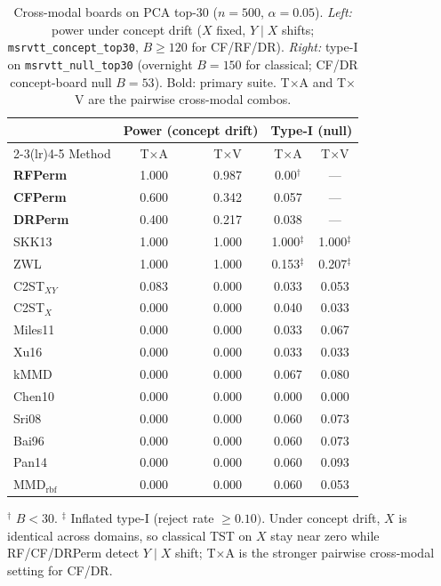 \begin{table}[t]
\centering
\small
\setlength{\tabcolsep}{5pt}
\caption{Cross-modal boards on PCA top-30 ($n=500$, $\alpha=0.05$).
  \emph{Left:} power under concept drift ($X$ fixed, $Y\mid X$ shifts;
  \texttt{msrvtt\_concept\_top30}, $B\ge 120$ for CF/RF/DR).
  \emph{Right:} type-I on \texttt{msrvtt\_null\_top30}
  (overnight $B=150$ for classical; CF/DR concept-board null $B=53$).
  Bold: primary suite. T$\times$A and T$\times$V are the pairwise cross-modal combos.}
\label{tab:cross-modal-TA-TV}
\begin{tabular}{l cc @{\hspace{1.2em}} cc}
\toprule
& \multicolumn{2}{c}{\textbf{Power} (concept drift)}
& \multicolumn{2}{c}{\textbf{Type-I} (null)} \\
\cmidrule(lr){2-3}\cmidrule(lr){4-5}
Method & T$\times$A & T$\times$V & T$\times$A & T$\times$V \\
\midrule
\textbf{RFPerm} & 1.000 & 0.987 & 0.00$^\dagger$ & --- \\
\textbf{CFPerm} & 0.600 & 0.342 & 0.057 & --- \\
\textbf{DRPerm} & 0.400 & 0.217 & 0.038 & --- \\
\midrule
SKK13 & 1.000 & 1.000 & 1.000$^\ddagger$ & 1.000$^\ddagger$ \\
ZWL & 1.000 & 1.000 & 0.153$^\ddagger$ & 0.207$^\ddagger$ \\
C2ST$_{XY}$ & 0.083 & 0.000 & 0.033 & 0.053 \\
C2ST$_X$ & 0.000 & 0.000 & 0.040 & 0.033 \\
Miles11 & 0.000 & 0.000 & 0.033 & 0.067 \\
Xu16 & 0.000 & 0.000 & 0.033 & 0.033 \\
kMMD & 0.000 & 0.000 & 0.067 & 0.080 \\
Chen10 & 0.000 & 0.000 & 0.000 & 0.000 \\
Sri08 & 0.000 & 0.000 & 0.060 & 0.073 \\
Bai96 & 0.000 & 0.000 & 0.060 & 0.073 \\
Pan14 & 0.000 & 0.000 & 0.060 & 0.093 \\
MMD$_{\mathrm{rbf}}$ & 0.000 & 0.000 & 0.060 & 0.053 \\
\bottomrule
\end{tabular}
\vspace{2pt}
{\footnotesize $^\dagger$ $B<30$.
 $^\ddagger$ Inflated type-I (reject rate $\ge 0.10)$.
 Under concept drift, $X$ is identical across domains, so classical TST on $X$
 stay near zero while RF/CF/DRPerm detect $Y\mid X$ shift;
 T$\times$A is the stronger pairwise cross-modal setting for CF/DR.}
\end{table}
